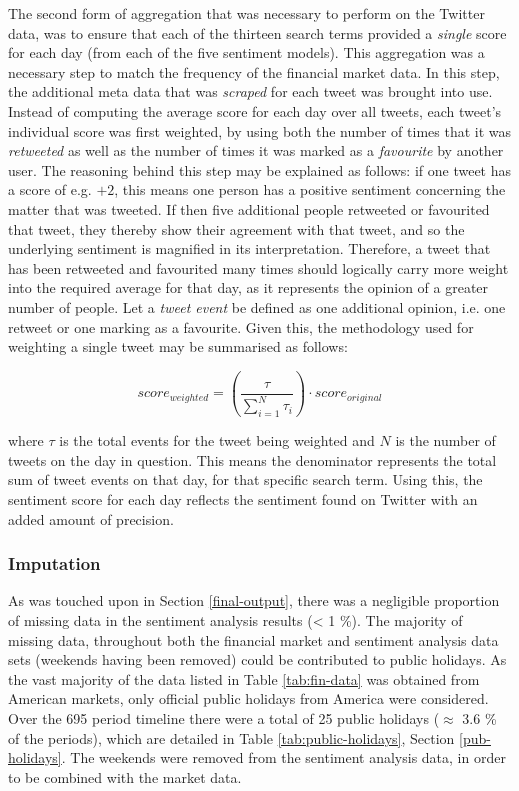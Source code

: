 \documentclass{article}
\begin{document}
The second form of aggregation that was necessary to perform on the Twitter data, was to ensure that each of the thirteen search terms provided a \emph{single} score for each day (from each of the five sentiment models). This aggregation was a necessary step to match the frequency of the financial market data. In this step, the additional meta data that was \emph{scraped} for each tweet was brought into use. Instead of computing the average score for each day over all tweets, each tweet's individual score was first weighted, by using both the number of times that it was \emph{retweeted} as well as the number of times it was marked as a \emph{favourite} by another user. The reasoning behind this step may be explained as follows: if one tweet has a score of e.g. $+2$, this means one person has a positive sentiment concerning the matter that was tweeted. If then five additional people retweeted or favourited that tweet, they thereby show their agreement with that tweet, and so the underlying sentiment is magnified in its interpretation. Therefore, a tweet that has been retweeted and favourited many times should logically carry more weight into the required average for that day, as it represents the opinion of a greater number of people. Let a \emph{tweet event} be defined as one additional opinion, i.e. one retweet or one marking as a favourite. Given this, the methodology used for weighting a single tweet may be summarised as follows:

\begin{equation}
  score_{weighted} = \left( \frac {\tau }{ \sum_{i = 1}^{N} \tau_{i} } \right) \cdot score_{original}
  \label{eqn-reweight}
\end{equation}

\vspace{3mm}

where $\tau$ is the total events for the tweet being weighted and $N$ is the number of tweets on the day in question. This means the denominator represents the total sum of tweet events on that day, for that specific search term. Using this, the sentiment score for each day reflects the sentiment found on Twitter with an added amount of precision.


\subsubsection{Imputation \label{imputation}}
\label{sec-6-2-2}

As was touched upon in Section \ref{final-output}, there was a negligible proportion of missing data in the sentiment analysis results (< 1 \%). The majority of missing data, throughout both the financial market and sentiment analysis data sets (weekends having been removed) could be contributed to public holidays. As the vast majority of the data listed in Table \ref{tab:fin-data} was obtained from American markets, only official public holidays from America were considered. Over the 695 period timeline there were a total of 25 public holidays ($\approx$ 3.6 \% of the periods), which are detailed in Table \ref{tab:public-holidays}, Section \ref{pub-holidays}. The weekends were removed from the sentiment analysis data, in order to be combined with the market data.
\end{document}
